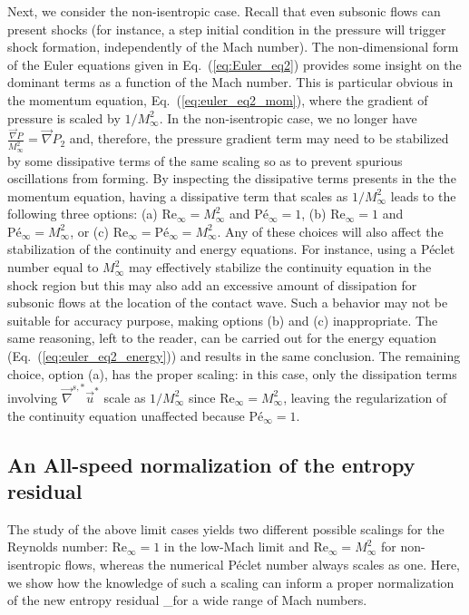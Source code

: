 \documentclass[review,10pt]{elsarticle}
\newcommand{\grad}{\vec{\nabla}}
\newcommand{\gradd}[1]{\vec{\nabla}^{#1}}
\renewcommand{\Re}{\textrm{Re}}
\newcommand{\Pe}{\textrm{P\'e}}
\newcommand{\resinew}{\widetilde{R}_\text{ent}}
\newcommand{\eqt}[1]{Eq.~(\ref{#1})}                     %
\begin{document}
Next, we consider the non-isentropic case. Recall that even subsonic flows can present shocks (for instance, 
a step initial condition in the pressure will trigger shock formation, independently of the Mach number). 
The non-dimensional form of the Euler equations given in \eqt{eq:Euler_eq2} provides some insight on the 
dominant terms as a function of the Mach number. This is particular obvious in the momentum equation, \eqt{eq:euler_eq2_mom}, 
where the gradient of pressure is scaled by $1/M_\infty^2$. In the non-isentropic case, we no longer 
have $\frac{\grad P}{M_\infty^2}=\grad P_2$ and, therefore, the pressure gradient term may need to be stabilized by 
some dissipative terms of the same scaling so as to prevent spurious oscillations from forming. 
By inspecting the dissipative terms presents in the the momentum equation, having a dissipative term that 
scales as $1/M_\infty^2$ leads to the following three options: 
(a) $\Re_\infty = M_\infty^2$ and $\Pe_\infty = 1$,
(b) $\Re_\infty = 1$ and $\Pe_\infty = M_\infty^2$, or
(c) $\Re_\infty = \Pe_\infty = M_\infty^2$. 
%
Any of these choices will also affect the stabilization of the continuity and energy equations. 
For instance, using a P\'eclet number equal to $M_\infty^2$ may effectively stabilize the continuity 
equation in the shock region but this may also add an excessive amount of dissipation for subsonic 
flows at the location of the contact wave. Such a behavior may not be suitable for accuracy purpose, 
making options (b) and (c) inappropriate. The same reasoning, left to the reader, can be carried out 
for the energy equation (\eqt{eq:euler_eq2_energy}) and results in the same conclusion. The remaining 
choice, option (a), has the proper scaling: in this case, only the dissipation terms involving 
$\gradd{s,*} \vec{u}^*$ scale as $1/M_\infty^2$ since $\Re_\infty = M_\infty^2$, leaving the 
regularization of the continuity equation unaffected because $\Pe_\infty = 1$.
%
%
\subsection{An All-speed normalization of the entropy residual} \label{sec:new_normaliz}

The study of the above limit cases yields two different possible scalings for the Reynolds number: 
$\Re_\infty = 1$ in the low-Mach limit and $\Re_\infty  = M_\infty^2$ for non-isentropic flows, 
whereas the numerical P\'eclet number always scales as one. Here, we show how the knowledge of 
such a scaling can inform a proper normalization of the new entropy residual \resinew for a wide range of Mach numbers.
\end{document}
